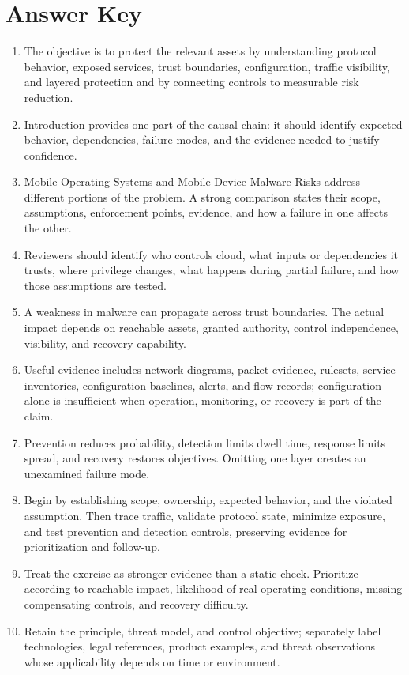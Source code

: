 \documentclass[11pt]{article}
\begin{document}
\section*{Answer Key}
\begin{enumerate}
\item The objective is to protect the relevant assets by understanding protocol behavior, exposed services, trust boundaries, configuration, traffic visibility, and layered protection and by connecting controls to measurable risk reduction.
\item Introduction provides one part of the causal chain: it should identify expected behavior, dependencies, failure modes, and the evidence needed to justify confidence.
\item Mobile Operating Systems and Mobile Device Malware Risks address different portions of the problem. A strong comparison states their scope, assumptions, enforcement points, evidence, and how a failure in one affects the other.
\item Reviewers should identify who controls cloud, what inputs or dependencies it trusts, where privilege changes, what happens during partial failure, and how those assumptions are tested.
\item A weakness in malware can propagate across trust boundaries. The actual impact depends on reachable assets, granted authority, control independence, visibility, and recovery capability.
\item Useful evidence includes network diagrams, packet evidence, rulesets, service inventories, configuration baselines, alerts, and flow records; configuration alone is insufficient when operation, monitoring, or recovery is part of the claim.
\item Prevention reduces probability, detection limits dwell time, response limits spread, and recovery restores objectives. Omitting one layer creates an unexamined failure mode.
\item Begin by establishing scope, ownership, expected behavior, and the violated assumption. Then trace traffic, validate protocol state, minimize exposure, and test prevention and detection controls, preserving evidence for prioritization and follow-up.
\item Treat the exercise as stronger evidence than a static check. Prioritize according to reachable impact, likelihood of real operating conditions, missing compensating controls, and recovery difficulty.
\item Retain the principle, threat model, and control objective; separately label technologies, legal references, product examples, and threat observations whose applicability depends on time or environment.
\end{enumerate}
\end{document}
